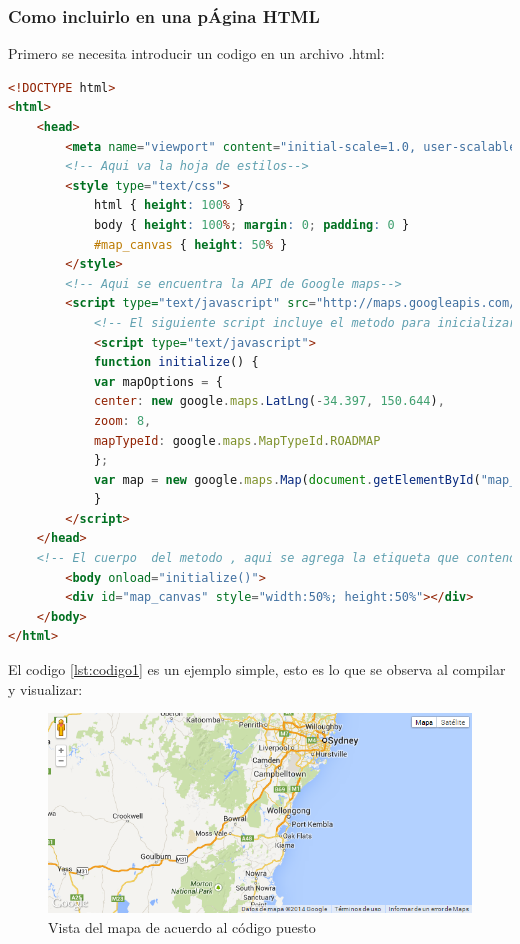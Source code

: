     \subsubsection{Como incluirlo en una pÁgina HTML}
    Primero se necesita introducir un codigo en un archivo .html:
\begin{lstlisting}[language=HTML, caption=Ejemplo simple, label=lst:codigo1]
<!DOCTYPE html>
<html>
    <head>
        <meta name="viewport" content="initial-scale=1.0, user-scalable=no" />
        <!-- Aqui va la hoja de estilos-->
        <style type="text/css">
            html { height: 100% }
            body { height: 100%; margin: 0; padding: 0 }
            #map_canvas { height: 50% }
        </style>
        <!-- Aqui se encuentra la API de Google maps-->
        <script type="text/javascript" src="http://maps.googleapis.com/maps/api/js?sensor=true"></script>
            <!-- El siguiente script incluye el metodo para inicializar la API, con la configuracion mencionada y referencia la etiqueta del cuerpo-->
            <script type="text/javascript">
            function initialize() {
            var mapOptions = {
            center: new google.maps.LatLng(-34.397, 150.644),
            zoom: 8,
            mapTypeId: google.maps.MapTypeId.ROADMAP
            };
            var map = new google.maps.Map(document.getElementById("map_canvas"),mapOptions);
            }
        </script>
    </head>
    <!-- El cuerpo  del metodo , aqui se agrega la etiqueta que contendra la API-->
        <body onload="initialize()">
        <div id="map_canvas" style="width:50%; height:50%"></div>
    </body>
</html>

\end{lstlisting}
El codigo \ref{lst:codigo1} es un ejemplo simple, esto es lo que se observa al compilar y visualizar:\\

    \begin{figure}[hbtp]
        \centering
            \includegraphics{Imagenes/Cap2_3_3.png}
            \caption{Vista del mapa de acuerdo al código puesto} 
            \label{fig:Cap2_3_3}
    \end{figure}
    
